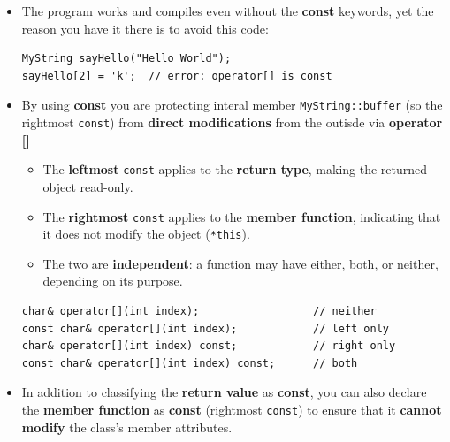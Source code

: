 \documentclass[10pt]{article}
\begin{document}
\begin{itemize}
	\begin{verbatim}
	const char& operator[] (int index) const
	{
		if (index < GetLength())
			return buffer[index];

		return buffer[0]; // failed
	}
	\end{verbatim}

\item The program works and compiles even without the \textbf{const} keywords, yet the reason you have it there is to avoid this code:

	\begin{verbatim}
MyString sayHello("Hello World");
sayHello[2] = 'k';	// error: operator[] is const
	\end{verbatim}

\item By using \textbf{const} you are protecting interal member \verb|MyString::buffer| (so the rightmost \verb|const|) from \textbf{direct modifications} from the outisde via \textbf{operator []}

\begin{itemize}
    \item The \textbf{leftmost} \verb|const| applies to the \textbf{return type}, making the returned object read-only.

    \item The \textbf{rightmost} \verb|const| applies to the \textbf{member function}, indicating that it does not modify the object (\verb|*this|).

    \item The two are \textbf{independent}: a function may have either, both, or neither, depending on its purpose.
\end{itemize}

\begin{verbatim}
char& operator[](int index);                  // neither
const char& operator[](int index);            // left only
char& operator[](int index) const;            // right only
const char& operator[](int index) const;      // both
\end{verbatim}

\item In addition to classifying the \textbf{return value} as \textbf{const}, you can also declare the \textbf{member function} as \textbf{const} (rightmost \verb|const|) to ensure that it \textbf{cannot modify} the class's member attributes.

\end{itemize}

\newpage
\end{document}
